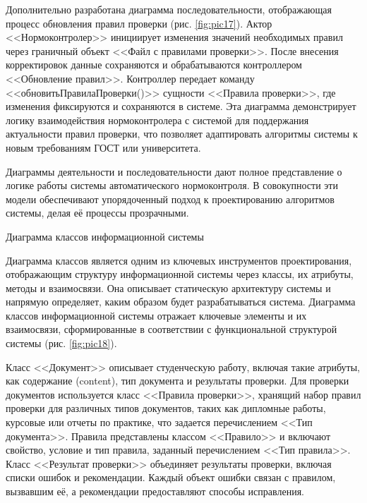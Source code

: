 \documentclass{report}
\begin{document}
Дополнительно разработана диаграмма последовательности, отображающая процесс обновления правил проверки (рис.  \ref{fig:pic17}). Актор <<Нормоконтролер>> инициирует изменения значений необходимых правил через граничный объект <<Файл с правилами проверки>>. После внесения корректировок данные сохраняются и обрабатываются контроллером <<Обновление правил>>. Контроллер передает команду <<обновитьПравилаПроверки()>> сущности <<Правила проверки>>, где изменения фиксируются и сохраняются в системе. Эта диаграмма демонстрирует логику взаимодействия нормоконтролера с системой для поддержания актуальности правил проверки, что позволяет адаптировать алгоритмы системы к новым требованиям ГОСТ или университета.


Диаграммы деятельности и последовательности дают полное представление о логике работы системы автоматического нормоконтроля. В совокупности эти модели обеспечивают упорядоченный подход к проектированию алгоритмов системы, делая её процессы прозрачными.

Диаграмма классов информационной системы

Диаграмма классов является одним из ключевых инструментов проектирования, отображающим структуру информационной системы через классы, их атрибуты, методы и взаимосвязи. Она описывает статическую архитектуру системы %
и напрямую определяет, каким образом будет разрабатываться система. 
Диаграмма классов информационной системы отражает ключевые элементы и их взаимосвязи, сформированные в соответствии с функциональной структурой системы (рис. \ref{fig:pic18}). 

Класс <<Документ>> описывает студенческую работу, включая такие атрибуты, как содержание (content), тип документа и результаты проверки. Для проверки документов используется класс <<Правила проверки>>, хранящий набор правил проверки для различных типов документов, таких как дипломные работы, курсовые или отчеты по практике, что задается перечислением <<Тип документа>>. Правила представлены классом <<Правило>> и включают свойство, условие и тип правила, заданный перечислением <<Тип правила>>. Класс <<Результат проверки>> объединяет результаты проверки, включая списки ошибок и рекомендации. Каждый объект ошибки связан с правилом, вызвавшим её, а рекомендации предоставляют способы исправления.
\end{document}
